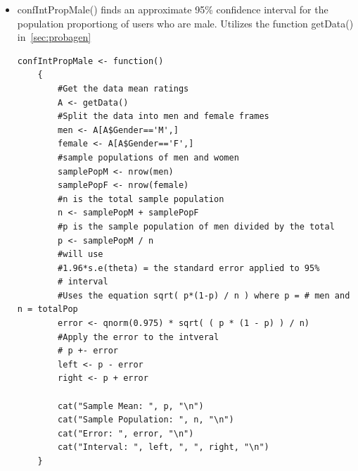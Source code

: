 \documentclass[11pt]{article}  %
\begin{document}
\begin{itemize}
    \label{sec:CIPM}
    \item confIntPropMale() finds an approximate 95\% confidence interval for the population proportiong of users who are male. Utilizes the function getData() in~\ref{sec:probagen}
    \begin{lstlisting}[basicstyle=\small]
    confIntPropMale <- function()
    {
    	#Get the data mean ratings
    	A <- getData()
    	#Split the data into men and female frames
    	men <- A[A$Gender=='M',]
    	female <- A[A$Gender=='F',]
    	#sample populations of men and women
    	samplePopM <- nrow(men)
    	samplePopF <- nrow(female)
    	#n is the total sample population
    	n <- samplePopM + samplePopF
    	#p is the sample population of men divided by the total
    	p <- samplePopM / n
    	#will use 
    	#1.96*s.e(theta) = the standard error applied to 95%
    	# interval
    	#Uses the equation sqrt( p*(1-p) / n ) where p = # men and n = totalPop
    	error <- qnorm(0.975) * sqrt( ( p * (1 - p) ) / n)
    	#Apply the error to the intveral
    	# p +- error
    	left <- p - error
    	right <- p + error
    
    	cat("Sample Mean: ", p, "\n")
    	cat("Sample Population: ", n, "\n")
    	cat("Error: ", error, "\n")
    	cat("Interval: ", left, ", ", right, "\n")
    }
    
    \end{lstlisting}
\end{itemize}

\end{document}
